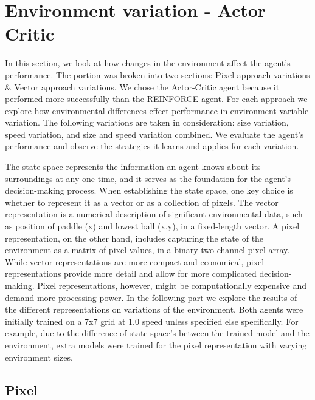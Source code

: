 \documentclass{article}
\begin{document}
\section{Environment variation - Actor Critic}
\label{Environment}
In this section, we look at how changes in the environment affect the agent's performance. 
The portion was broken into two sections: Pixel approach variations \& Vector approach variations.
We chose the Actor-Critic agent because it performed more successfully than the REINFORCE agent.
For each approach we explore how environmental differences effect performance in environment variable variation. 
The following variations are taken in consideration: size variation, speed variation, and size and speed variation combined.
We evaluate the agent's performance and observe the strategies it learns and applies for each variation.

The state space represents the information an agent knows about its surroundings at any one time, and it serves as the foundation for the agent's decision-making process. 
When establishing the state space, one key choice is whether to represent it as a vector or as a collection of pixels.
The vector representation is a numerical description of significant environmental data, such as position of paddle (x) and lowest ball (x,y), in a fixed-length vector.
A pixel representation, on the other hand, includes capturing the state of the environment as a matrix of pixel values, in a binary-two channel pixel array.
While vector representations are more compact and economical, pixel representations provide more detail and allow for more complicated decision-making.
Pixel representations, however, might be computationally expensive and demand more processing power.
In the following part we explore the results of the different representations on variations of the environment.
Both agents were initially trained on a 7x7 grid at 1.0 speed unless specified else specifically.
For example, due to the difference of state space's between the trained model and the environment, extra models were trained for the pixel representation with varying environment sizes.


\subsection{Pixel}
\label{ENV-PV}
\end{document}
